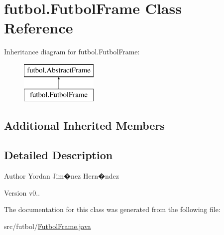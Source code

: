 \hypertarget{classfutbol_1_1_futbol_frame}{}\section{futbol.\+Futbol\+Frame Class Reference}
\label{classfutbol_1_1_futbol_frame}
Inheritance diagram for futbol.\+Futbol\+Frame\+:\begin{figure}[H]
\begin{center}
\leavevmode
\includegraphics[height=2.000000cm]{classfutbol_1_1_futbol_frame}
\end{center}
\end{figure}
\subsection*{Additional Inherited Members}


\subsection{Detailed Description}
\begin{DoxyAuthor}{Author}
Yordan Jim�nez Hern�ndez 
\end{DoxyAuthor}
\begin{DoxyVersion}{Version}
v0.. 
\end{DoxyVersion}


The documentation for this class was generated from the following file\+:\begin{DoxyCompactItemize}
\item 
src/futbol/\hyperlink{_futbol_frame_8java}{Futbol\+Frame.\+java}\end{DoxyCompactItemize}
